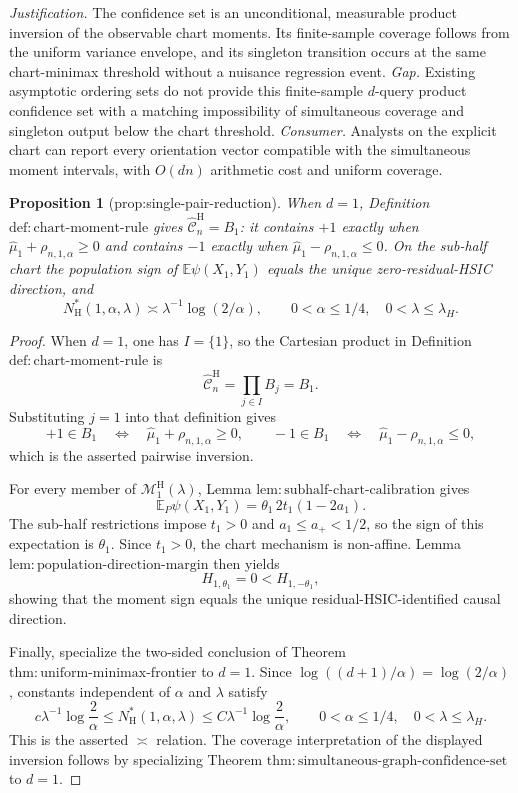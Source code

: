 \documentclass{article}
\newtheorem{proposition}{Proposition}
\begin{document}
\par\smallskip\noindent \textit{Justification.} The confidence set is an unconditional, measurable product inversion of the observable chart moments. Its finite-sample coverage follows from the uniform variance envelope, and its singleton transition occurs at the same chart-minimax threshold without a nuisance regression event. \textit{Gap.} Existing asymptotic ordering sets do not provide this finite-sample \(d\)-query product confidence set with a matching impossibility of simultaneous coverage and singleton output below the chart threshold. \textit{Consumer.} Analysts on the explicit chart can report every orientation vector compatible with the simultaneous moment intervals, with \(O(dn)\) arithmetic cost and uniform coverage.

\begin{proposition}[prop:single-pair-reduction]\label{prop:single-pair-reduction}
When \(d=1\), Definition \(\mathrm{def:chart\text{-}moment\text{-}rule}\) gives \(\widehat{\mathcal C}_n^{\mathrm H}=B_1\): it contains \(+1\) exactly when \(\widehat\mu_1+\rho_{n,1,\alpha}\ge0\) and contains \(-1\) exactly when \(\widehat\mu_1-\rho_{n,1,\alpha}\le0\).  On the sub-half chart the population sign of \(\mathbb E\psi(X_1,Y_1)\) equals the unique zero-residual-HSIC direction, and
\[
N_{\mathrm H}^*(1,\alpha,\lambda)\asymp
\lambda^{-1}\log(2/\alpha),
\qquad 0<\alpha\le1/4,\quad 0<\lambda\le\lambda_H.
\]
\end{proposition}
\begin{proof}
When \(d=1\), one has \(I=\{1\}\), so the Cartesian product in Definition \(\mathrm{def:chart\text{-}moment\text{-}rule}\) is
\[
\widehat{\mathcal C}_n^{\mathrm H}=\prod_{j\in I}B_j=B_1.
\]
Substituting \(j=1\) into that definition gives
\[
+1\in B_1
\quad\Longleftrightarrow\quad
\widehat\mu_1+\rho_{n,1,\alpha}\ge0,
\qquad
-1\in B_1
\quad\Longleftrightarrow\quad
\widehat\mu_1-\rho_{n,1,\alpha}\le0,
\]
which is the asserted pairwise inversion.

For every member of \(\mathcal M_1^{\mathrm H}(\lambda)\), Lemma \(\mathrm{lem:subhalf\text{-}chart\text{-}calibration}\) gives
\[
\mathbb E_P\psi(X_1,Y_1)=\theta_1\,2t_1(1-2a_1).
\]
The sub-half restrictions impose \(t_1>0\) and \(a_1\le a_+<1/2\), so the sign of this expectation is \(\theta_1\).  Since \(t_1>0\), the chart mechanism is non-affine.  Lemma \(\mathrm{lem:population\text{-}direction\text{-}margin}\) then yields
\[
H_{1,\theta_1}=0<H_{1,-\theta_1},
\]
showing that the moment sign equals the unique residual-HSIC-identified causal direction.

Finally, specialize the two-sided conclusion of Theorem \(\mathrm{thm:uniform\text{-}minimax\text{-}frontier}\) to \(d=1\).  Since \(\log((d+1)/\alpha)=\log(2/\alpha)\), constants independent of \(\alpha\) and \(\lambda\) satisfy
\[
c\lambda^{-1}\log\frac2\alpha
\le N_{\mathrm H}^*(1,\alpha,\lambda)
\le C\lambda^{-1}\log\frac2\alpha,
\qquad
0<\alpha\le1/4,\quad 0<\lambda\le\lambda_H.
\]
This is the asserted \(\asymp\) relation.  The coverage interpretation of the displayed inversion follows by specializing Theorem \(\mathrm{thm:simultaneous\text{-}graph\text{-}confidence\text{-}set}\) to \(d=1\).
\end{proof}
\end{document}
